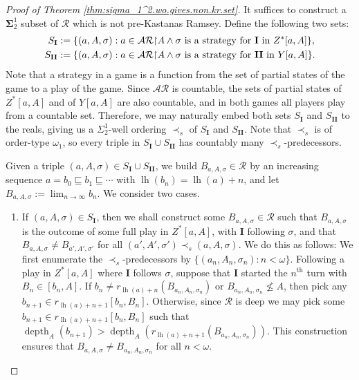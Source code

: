 \documentclass[11pt,reqno]{amsart}
\theoremstyle{plain}
\numberwithin{equation}{section}
\theoremstyle{definition}
\newcommand{\func}{\operatorname}
\newcommand{\cal}{\mathcal}
\newcommand{\restrictedto}{\mathord{\upharpoonright}}
\newcommand{\lh}{\func{lh}}
\newcommand{\depth}{\func{depth}}
\begin{document}
\begin{proof}[Proof of Theorem \ref{thm:sigma_1^2.wo.gives.non.kr.set}]
    It suffices to construct a $\mathbf{\Sigma}_2^1$ subset of $\cal{R}$ which is not pre-Kastanas Ramsey. Define the following two sets:
    \begin{align*}
        S_\textbf{I} &:= \{(a,A,\sigma) : a \in \cal{AR}\restrictedto A \wedge \text{$\sigma$ is a strategy for \textbf{I} in $Z^*[a,A]$}\}, \\
        S_\textbf{II} &:= \{(a,A,\sigma) : a \in \cal{AR}\restrictedto A \wedge \text{$\sigma$ is a strategy for \textbf{II} in $Y[a,A]$}\}.
    \end{align*}
    Note that a strategy in a game is a function from the set of partial states of the game to a play of the game. Since $\cal{AR}$ is countable, the sets of partial states of $Z^*[a,A]$ and of $Y[a,A]$ are also countable, and in both games all players play from a countable set. Therefore, we may naturally embed both sets $S_\textbf{I}$ and $S_\textbf{II}$ to the reals, giving us a $\Sigma_2^1$-well ordering $\prec_s$ of $S_\textbf{I}$ and $S_\textbf{II}$. Note that $\prec_s$ is of order-type $\omega_1$, so every triple in $S_\textbf{I} \cup S_\textbf{II}$ has countably many $\prec_s$-predecessors.
    
    Given a triple $(a,A,\sigma) \in S_\textbf{I} \cup S_\textbf{II}$, we build $B_{a,A,\sigma} \in \cal{R}$ by an increasing sequence $a = b_0 \sqsubseteq b_1 \sqsubseteq \cdots$ with $\lh(b_n) = \lh(a) + n$, and let $B_{a,A,\sigma} := \lim_{n\to\infty} b_n$. We consider two cases.
    \begin{enumerate}
        \item If $(a,A,\sigma) \in S_\textbf{I}$, then we shall construct some $B_{a,A,\sigma} \in \cal{R}$ such that $B_{a,A,\sigma}$ is the outcome of some full play in $Z^*[a,A]$, with \textbf{I} following $\sigma$, and that $B_{a,A,\sigma} \neq B_{a',A',\sigma'}$ for all $(a',A',\sigma') \prec_s (a,A,\sigma)$. We do this as follows: We first enumerate the $\prec_s$-predecessors by $\{(a_n,A_n,\sigma_n) : n < \omega\}$. Following a play in $Z^*[a,A]$ where \textbf{I} follows $\sigma$, suppose that \textbf{I} started the $n^\text{th}$ turn with $B_n \in [b_n,A]$. If $b_n \neq r_{\lh(a)+n}(B_{a_n,A_n,\sigma_n})$ or $B_{a_n,A_n,\sigma_n} \not\leq A$, then pick any $b_{n+1} \in r_{\lh(a)+n+1}[b_n,B_n]$. Otherwise, since $\cal{R}$ is deep we may pick some $b_{n+1} \in r_{\lh(a)+n+1}[b_n,B_n]$ such that $\depth_A(b_{n+1}) > \depth_A(r_{\lh(a)+n+1}(B_{a_n,A_n,\sigma_n}))$. This construction ensures that $B_{a,A,\sigma} \neq B_{a_n,A_n,\sigma_n}$ for all $n < \omega$.


\end{enumerate}
\end{proof}
\end{document}
